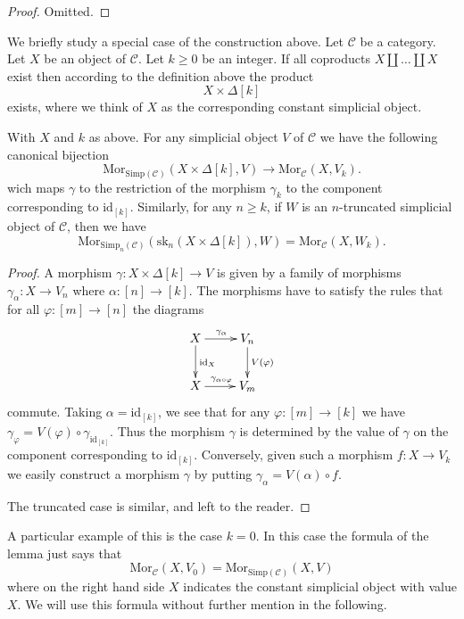 \begin{proof}
Omitted.
\end{proof}

\noindent
We briefly study a special case of the construction
above. Let $\mathcal{C}$ be a category.
Let $X$ be an object of $\mathcal{C}$.
Let $k \geq 0$ be an integer.
If all coproducts $X \coprod \ldots \coprod X$ exist
then according to the definition above the product
$$
X \times \Delta[k]
$$
exists, where we think of $X$ as the corresponding constant 
simplicial object.

\begin{lemma}
\label{lemma-morphism-from-coproduct}
With $X$ and $k$ as above.
For any simplicial object $V$ of
$\mathcal{C}$ we have the following
canonical bijection
$$
\text{Mor}_{\text{Simp}(\mathcal{C})}(X \times \Delta[k], V)
\longrightarrow
\text{Mor}_{\mathcal{C}}(X, V_k).
$$
wich maps $\gamma$ to the restriction of the
morphism $\gamma_k$ to the component corresponding
to $\text{id}_{[k]}$.
Similarly, for any $n \geq k$, if $W$ is an
$n$-truncated simplicial object
of $\mathcal{C}$, then we have
$$
\text{Mor}_{\text{Simp}_n(\mathcal{C})}(\text{sk}_n(X \times \Delta[k]), W)
=
\text{Mor}_{\mathcal{C}}(X, W_k).
$$
\end{lemma}

\begin{proof}
A morphism $\gamma : X \times \Delta[k] \to V$ is given by
a family of morphisms $\gamma_\alpha : X \to V_n$ where
$\alpha : [n] \to [k]$. The morphisms have to satisfy the
rules that for all $\varphi : [m] \to [n]$ the diagrams
$$
\xymatrix{
X \ar[r]^{\gamma_\alpha} \ar[d]^{\text{id}_X} & V_n \ar[d]^{V(\varphi)} \\
X \ar[r]^{\gamma_{\alpha \circ \varphi}} & V_m 
}
$$
commute. Taking $\alpha = \text{id}_{[k]}$, we see that
for any $\varphi : [m] \to [k]$ we have $\gamma_\varphi =
V(\varphi) \circ \gamma_{\text{id}_{[k]}}$. Thus the morphism
$\gamma$ is determined by the value of $\gamma$ on the
component corresponding to $\text{id}_{[k]}$. Conversely,
given such a morphism $f : X \to V_k$ we easily
construct a morphism $\gamma$ by putting
$\gamma_\alpha = V(\alpha) \circ f$.

\medskip\noindent
The truncated case is similar, and left to the reader.
\end{proof}

\noindent
A particular example of this is the case $k = 0$.
In this case the formula of the lemma just says
that
$$
\text{Mor}_\mathcal{C}(X, V_0) 
=
\text{Mor}_{\text{Simp}(\mathcal{C})}(X, V)
$$
where on the right hand side $X$ indicates the
constant simplicial object with value $X$. We will
use this formula without further mention in the
following.

